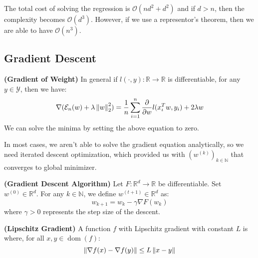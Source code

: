 \begin{remark}
    The total cost of solving the regression is $\mathcal{O}(nd^2 + d^2)$ and if $d>n$, then the complexity becomes $\mathcal{O}(d^3)$. However, if we use a representor's theorem, then we are able to have $\mathcal{O}(n^3)$. 
\end{remark}

\subsection{Gradient Descent}

\begin{definition}{\textbf{(Gradient of Weight)}}
    In general if $l(\cdot,y) : \mathbb{R}\rightarrow \mathbb{R}$ is differentiable, for any $y\in \mathcal{Y}$, then we have:
    \begin{equation*}
        \nabla( \mathcal{E}_n(w) + \lambda\left\lVert w\right\rVert^2_2 ) = \frac{1}{n}\sum^n_{i=1} \frac{\partial}{\partial w} l(x^T_iw, y_i) + 2\lambda w
    \end{equation*}
    We can solve the minima by setting the above equation to zero.
\end{definition}

\begin{remark}
    In most cases, we aren't able to solve the gradient equation analytically, so we need iterated descent optimization, which provided us with $(w^{(k)})_{k\in\mathbb{N}}$ that converges to global minimizer.
\end{remark}

\begin{definition}{\textbf{(Gradient Descent Algorithm)}}
    Let $F : \mathbb{R}^d\rightarrow \mathbb{R}$ be differentiable. Set $w^{(0)} \in \mathbb{R}^d$. For any $k\in\mathbb{N}$, we define $w^{(t+1)}\in \mathbb{R}^d$ as:
    \begin{equation*}
        w_{k+1} = w_{k} - \gamma \nabla F(w_{k})
    \end{equation*}
    where $\gamma>0$ represents the step size of the descent.
\end{definition}

\begin{definition}{\textbf{(Lipschitz Gradient)}}
    A function $f$ with Lipschitz gradient with constant $L$ is where, for all $x, y \in \operatorname{dom}(f)$:
    \begin{equation*}
        \left\lVert\nabla f(x) - \nabla f(y)\right\rVert \le L\left\lVert x-y\right\rVert 
    \end{equation*}
\end{definition}

